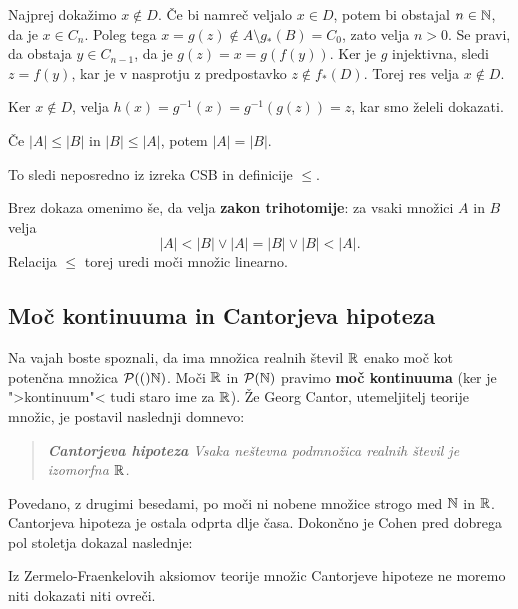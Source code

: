 \begin{dokaz}
\begin{enumerate}
    Najprej dokažimo $x \not\in D$. Če bi namreč veljalo $x \in D$, potem bi
    obstajal $n \in \mathbb{N}$, da je $x \in C_n$. Poleg tega
    $x = g(z) \not\in A \setminus g_{*}(B) = C_0$, zato velja $n > 0$. Se pravi,
    da obstaja $y \in C_{n-1}$, da je $g(z) = x = g(f(y))$. Ker je $g$
    injektivna, sledi $z = f(y)$, kar je v nasprotju z predpostavko
    $z \not\in f_{*}(D)$. Torej res velja $x \not\in D$.

    Ker $x \not\in D$, velja $h(x) = g^{-1}(x) = g^{-1}(g(z)) = z$, kar smo
    želeli dokazati.
  \end{enumerate}
\end{dokaz}

\begin{posledica}
  Če $|A| \leq |B|$ in $|B| \leq |A|$, potem $|A| = |B|$.
\end{posledica}

\begin{dokaz}
  To sledi neposredno iz izreka CSB in definicije $\leq$.
\end{dokaz}

Brez dokaza omenimo še, da velja \textbf{zakon trihotomije}: za vsaki množici $A$ in $B$
velja
%
\begin{equation*}
  |A| < |B| \lor |A| = |B| \lor |B| < |A|.
\end{equation*}
%
Relacija $\leq$ torej uredi moči množic linearno.



\subsection{Moč kontinuuma in Cantorjeva hipoteza}

Na vajah boste spoznali, da ima množica realnih števil $\mathbb{R}$ enako moč kot potenčna množica $\mathcal{P}(()\mathbb{N})$. Moči $\mathbb{R}$ in $\mathcal{P}(\mathbb{N})$ pravimo \textbf{moč kontinuuma} (ker je ">kontinuum"< tudi staro ime za $\mathbb{R}$). Že Georg Cantor, utemeljitelj teorije množic, je postavil naslednji domnevo:
%
\begin{quote}
  \emph{\textbf{Cantorjeva hipoteza} Vsaka neštevna podmnožica realnih števil je izomorfna $\mathbb{R}$.}
\end{quote}
%
Povedano, z drugimi besedami, po moči ni nobene množice strogo med $\mathbb{N}$ in $\mathbb{R}$. Cantorjeva hipoteza je ostala odprta dlje časa. Dokončno je Cohen pred dobrega pol stoletja dokazal naslednje:

\begin{izrek}[Cohen]
  Iz Zermelo-Fraenkelovih aksiomov teorije množic Cantorjeve hipoteze ne moremo niti dokazati niti ovreči.
\end{izrek}

